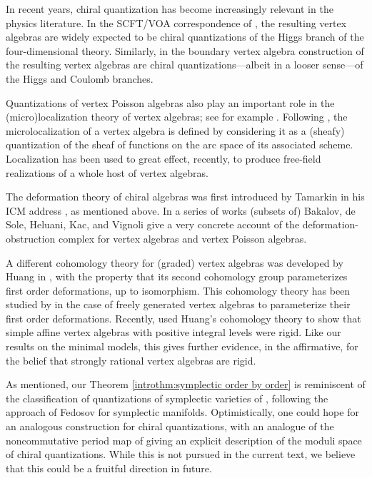 \documentclass[11pt]{amsart}
\numberwithin{equation}{section}
\theoremstyle{definition}
\newcommand{\0}{{\textbf{0}}}
\begin{document}
In recent years, chiral quantization has become increasingly relevant in the physics literature. In the SCFT/VOA correspondence of \cite{Beem4}, the resulting vertex algebras are widely expected to be chiral quantizations of the Higgs branch of the four-dimensional theory. Similarly, in the boundary vertex algebra construction of \cite{CosG} the resulting vertex algebras are chiral quantizations---albeit in a looser sense---of the Higgs and Coulomb branches.

Quantizations of vertex Poisson algebras also play an important role in the (micro)localization theory of vertex algebras; see for example \cite{Arakawa2015:local,Arakawa:2023cki}. Following \cite{KashiwaraRouquier,DoddKremnizer}, the microlocalization of a vertex algebra is defined by considering it as a (sheafy) quantization of the sheaf of functions on the arc space of its associated scheme. Localization has been used to great effect, recently, to produce free-field realizations of a whole host of vertex algebras.

The deformation theory of chiral algebras was first introduced by Tamarkin in his ICM address \cite{Tamarkin03}, as mentioned above. In a series of works \cite{BDSHK19, BDSHK20,BDHKV21} (subsets of) Bakalov, de Sole, Heluani, Kac, and Vignoli give a very concrete account of the deformation-obstruction complex for vertex algebras and vertex Poisson algebras.


A different cohomology theory for (graded) vertex algebras was developed by Huang in \cite{Huang:2010ud,Huang:2010yv}, with the property that its second cohomology group parameterizes first order deformations, up to isomorphism. This cohomology theory has been studied by \cite{Kovalchuk:2024rwd} in the case of freely generated vertex algebras to parameterize their first order deformations. Recently, \cite{Linshaw26} used Huang's cohomology theory to show that simple affine vertex algebras with positive integral levels were rigid. Like our results on the minimal models, this gives further evidence, in the affirmative, for the belief that strongly rational vertex algebras are rigid. 


As mentioned, our Theorem \ref{introthm:symplectic order by order} is reminiscent of the classification of quantizations of symplectic varieties of \cite{BeK}, following the approach of Fedosov \cite{Fedosov1994} for symplectic manifolds.
Optimistically, one could hope for an analogous construction for chiral quantizations, with an analogue of the noncommutative period map of \cite{BeK} giving an explicit description of the moduli space of chiral quantizations. While this is not pursued in the current text, we believe that this could be a fruitful direction in future.
\end{document}
